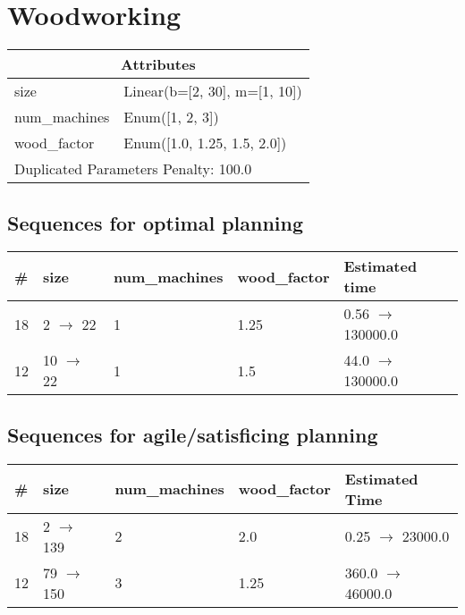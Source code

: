 \documentclass{article}
\begin{document}
                            \newpage \section{Woodworking}
                    \begin{center}
                    \begin{tabular}{@{}p{}p{}@{}}
                    \multicolumn{2}{c}{\bf \large Attributes}\\\midrule
                    size & Linear(b=[2, 30], m=[1, 10])\\
num\_machines & Enum([1, 2, 3])\\
wood\_factor & Enum([1.0, 1.25, 1.5, 2.0]) \\\midrule
                    \multicolumn{2}{l}{Duplicated Parameters Penalty: 100.0}
                    \end{tabular}
                    \end{center}
                
                            \subsection*{Sequences for optimal planning}

                            \begin{center}
                            \begin{tabular}{@{}l|l|l|l|l@{}}
                            \# & size & num\_machines & wood\_factor & Estimated time\\\midrule
                            18&2 $\rightarrow$ 22&1&1.25&0.56 $\rightarrow$ 130000.0\\
12&10 $\rightarrow$ 22&1&1.5&44.0 $\rightarrow$ 130000.0
                            \end{tabular}
                            \end{center}
                    
                         \subsection*{Sequences for agile/satisficing planning}

                        \begin{center}
                        \begin{tabular}{@{}l|l|l|l|l@{}}
                        \# & size & num\_machines & wood\_factor & Estimated Time\\\midrule
                        18&2 $\rightarrow$ 139&2&2.0&0.25 $\rightarrow$ 23000.0\\
12&79 $\rightarrow$ 150&3&1.25&360.0 $\rightarrow$ 46000.0
                        \end{tabular}
                        \end{center}
                    
\end{document}
